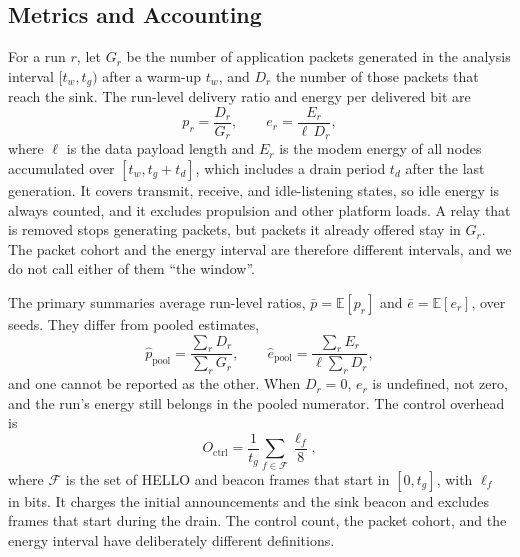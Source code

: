 \subsection{Metrics and Accounting}
\label{sec:metrics}
For a run $r$, let $G_r$ be the number of application packets generated in the analysis interval $[t_w,t_g)$ after a warm-up $t_w$, and $D_r$ the number of those packets that reach the sink. The run-level delivery ratio and energy per delivered bit are
\begin{equation}
p_r=\frac{D_r}{G_r},\qquad e_r=\frac{E_r}{\ell\,D_r},
\label{eq:runmetrics}
\end{equation}
where $\ell$ is the data payload length and $E_r$ is the modem energy of all nodes accumulated over $[t_w,t_g+t_d]$, which includes a drain period $t_d$ after the last generation. It covers transmit, receive, and idle-listening states, so idle energy is always counted, and it excludes propulsion and other platform loads. A relay that is removed stops generating packets, but packets it already offered stay in $G_r$. The packet cohort and the energy interval are therefore different intervals, and we do not call either of them ``the window''.

The primary summaries average run-level ratios, $\bar p=\mathbb{E}[p_r]$ and $\bar e=\mathbb{E}[e_r]$, over seeds. They differ from pooled estimates,
\begin{equation}
\hat p_{\mathrm{pool}}=\frac{\sum_r D_r}{\sum_r G_r},\qquad \hat e_{\mathrm{pool}}=\frac{\sum_r E_r}{\ell\sum_r D_r},
\label{eq:pooled}
\end{equation}
and one cannot be reported as the other. When $D_r=0$, $e_r$ is undefined, not zero, and the run's energy still belongs in the pooled numerator. The control overhead is
\begin{equation}
O_{\mathrm{ctrl}}=\frac{1}{t_g}\sum_{f\in\mathcal{F}}\frac{\ell_f}{8},
\label{eq:octrl}
\end{equation}
where $\mathcal{F}$ is the set of HELLO and beacon frames that start in $[0,t_g]$, with $\ell_f$ in bits. It charges the initial announcements and the sink beacon and excludes frames that start during the drain. The control count, the packet cohort, and the energy interval have deliberately different definitions.
